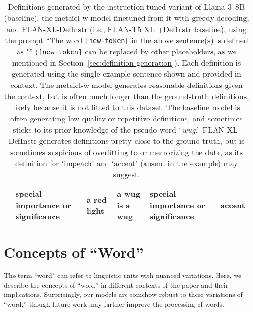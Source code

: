 \documentclass{article}
\begin{document}
\begin{table*}[t]
\begin{center}
\begin{tabular}{p{2.6cm}p{2.1cm}p{2.6cm}p{2.1cm}p{2.7cm}p{1.2cm}}
& special importance or significance
& a red light
& a wug is a wug
& special importance or significance
& accent
\\
\bottomrule
\end{tabular}
\end{center}
\caption{Definitions generated by the instruction-tuned variant of \mbox{Llama-3 8B} (baseline), the \ac{metaicl-w} model finetuned from it with greedy decoding, and \mbox{FLAN-XL-DefInstr} (i.e., \mbox{FLAN-T5} XL +DefInstr baseline), using the prompt ``The word \texttt{[new-token]} in the above sentence(s) is defined as "'' (\texttt{[new-token]} can be replaced by other placeholders, as we mentioned in Section~\ref{sec:definition-generation}).
Each definition is generated using the single example sentence shown and provided in context.
The \ac{metaicl-w} model generates reasonable definitions given the context, but is often much longer than the ground-truth definitions, likely because it is not fitted to this dataset.
The baseline model is often generating low-quality or repetitive definitions, and sometimes sticks to its prior knowledge of the pseudo-word ``\emph{wug}.''
FLAN-XL-DefInstr generates definitions pretty close to the ground-truth, but is sometimes suspicious of overfitting to or memorizing the data, as its definition for `impeach' and `accent' (absent in the example) may suggest.}
\label{tab:oxford-definition}
\end{table*}


\clearpage\clearpage
\section{Concepts of ``Word''}
\label{app:word}
The term ``word'' can refer to linguistic units with nuanced variations.
Here, we describe the concepts of ``word'' in different contexts of the paper and their implications.
Surprisingly, our models are somehow robust to these variations of ``word,'' though future work may further improve the processing of words.
\end{document}
